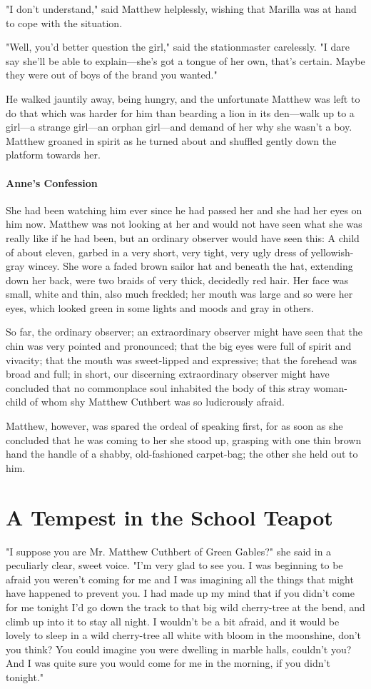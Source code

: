 \documentclass{article}
\begin{document}
"I don't understand," said Matthew helplessly, wishing that Marilla was at hand to cope with the situation.

"Well, you'd better question the girl," said the stationmaster carelessly. "I dare say she'll be able to explain---she's got a tongue of her own, that's certain. Maybe they were out of boys of the brand you wanted."

He walked jauntily away, being hungry, and the unfortunate Matthew was left to do that which was harder for him than bearding a lion in its den---walk up to a girl---a strange girl---an orphan girl---and demand of her why she wasn't a boy. Matthew groaned in spirit as he turned about and shuffled gently down the platform towards her.
 
\paragraph{Anne's Confession}
She had been watching him ever since he had passed her and she had her eyes on him now. Matthew was not looking at her and would not have seen what she was really like if he had been, but an ordinary observer would have seen this: A child of about eleven, garbed in a very short, very tight, very ugly dress of yellowish-gray wincey. She wore a faded brown sailor hat and beneath the hat, extending down her back, were two braids of very thick, decidedly red hair. Her face was small, white and thin, also much freckled; her mouth was large and so were her eyes, which looked green in some lights and moods and gray in others.

So far, the ordinary observer; an extraordinary observer might have seen that the chin was very pointed and pronounced; that the big eyes were full of spirit and vivacity; that the mouth was sweet-lipped and expressive; that the forehead was broad and full; in short, our discerning extraordinary observer might have concluded that no commonplace soul inhabited the body of this stray woman-child of whom shy Matthew Cuthbert was so ludicrously afraid.

Matthew, however, was spared the ordeal of speaking first, for as soon as she concluded that he was coming to her she stood up, grasping with one thin brown hand the handle of a shabby, old-fashioned carpet-bag; the other she held out to him.

\section{A Tempest in the School Teapot}
"I suppose you are Mr. Matthew Cuthbert of Green Gables?" she said in a peculiarly clear, sweet voice. "I'm very glad to see you. I was beginning to be afraid you weren't coming for me and I was imagining all the things that might have happened to prevent you. I had made up my mind that if you didn't come for me tonight I'd go down the track to that big wild cherry-tree at the bend, and climb up into it to stay all night. I wouldn't be a bit afraid, and it would be lovely to sleep in a wild cherry-tree all white with bloom in the moonshine, don't you think? You could imagine you were dwelling in marble halls, couldn't you? And I was quite sure you would come for me in the morning, if you didn't tonight."
\end{document}
